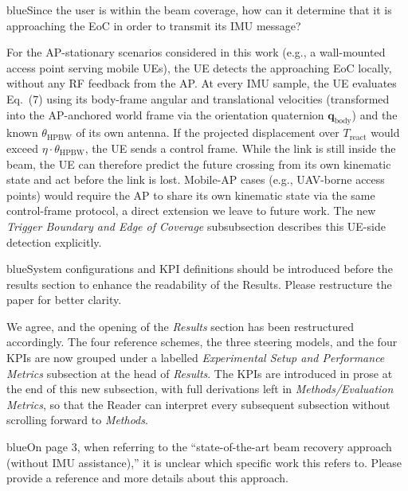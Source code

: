 \documentclass{article}
\newcommand{\blue}[1]{\begin{color}{blue}#1\end{color}}
\begin{document}
\begin{tcbremark}
{\selectfont
\blue{Since the user is within the beam coverage, how can it determine that it is approaching the EoC in order to transmit its IMU message?}
}
\end{tcbremark}

\noindent For the AP-stationary scenarios considered in this work (e.g., a wall-mounted access point serving mobile UEs), the UE detects the approaching EoC locally, without any RF feedback from the AP. At every IMU sample, the UE evaluates Eq.~(7) using its body-frame angular and translational velocities (transformed into the AP-anchored world frame via the orientation quaternion $\mathbf{q}_{\text{body}}$) and the known $\theta_{\text{HPBW}}$ of its own antenna. If the projected displacement over $T_{\text{react}}$ would exceed $\eta \cdot \theta_{\text{HPBW}}$, the UE sends a control frame. While the link is still inside the beam, the UE can therefore predict the future crossing from its own kinematic state and act before the link is lost. Mobile-AP cases (e.g., UAV-borne access points) would require the AP to share its own kinematic state via the same control-frame protocol, a direct extension we leave to future work. The new \emph{Trigger Boundary and Edge of Coverage} subsubsection describes this UE-side detection explicitly.

\begin{tcbremark}
{\selectfont
\blue{System configurations and KPI definitions should be introduced before the results section to enhance the readability of the Results. Please restructure the paper for better clarity.}
}
\end{tcbremark}

\noindent We agree, and the opening of the \emph{Results} section has been restructured accordingly. The four reference schemes, the three steering models, and the four KPIs are now grouped under a labelled \emph{Experimental Setup and Performance Metrics} subsection at the head of \emph{Results}. The KPIs are introduced in prose at the end of this new subsection, with full derivations left in \emph{Methods/Evaluation Metrics}, so that the Reader can interpret every subsequent subsection without scrolling forward to \emph{Methods}.

\begin{tcbremark}
{\selectfont
\blue{On page 3, when referring to the ``state-of-the-art beam recovery approach (without IMU assistance),'' it is unclear which specific work this refers to. Please provide a reference and more details about this approach.}
}
\end{tcbremark}
\end{document}
